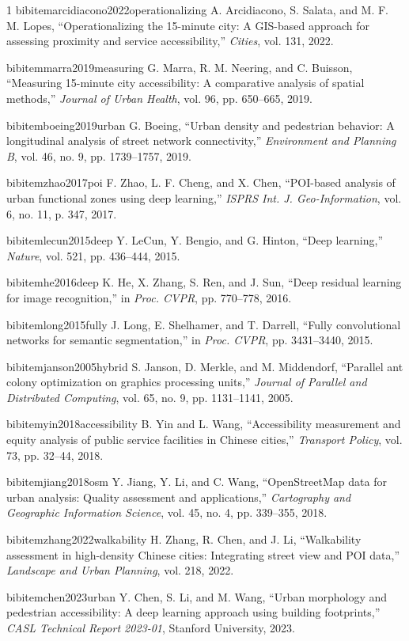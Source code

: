 \documentclass[journal]{IEEEtran}
\begin{document}
\begin{thebibliography}{1}
bibitem{arcidiacono2022operationalizing} A. Arcidiacono, S. Salata, and M. F. M. Lopes, ``Operationalizing the 15-minute city: A GIS-based approach for assessing proximity and service accessibility,'' \emph{Cities}, vol. 131, 2022.

bibitem{marra2019measuring} G. Marra, R. M. Neering, and C. Buisson, ``Measuring 15-minute city accessibility: A comparative analysis of spatial methods,'' \emph{Journal of Urban Health}, vol. 96, pp. 650--665, 2019.

bibitem{boeing2019urban} G. Boeing, ``Urban density and pedestrian behavior: A longitudinal analysis of street network connectivity,'' \emph{Environment and Planning B}, vol. 46, no. 9, pp. 1739--1757, 2019.

bibitem{zhao2017poi} F. Zhao, L. F. Cheng, and X. Chen, ``POI-based analysis of urban functional zones using deep learning,'' \emph{ISPRS Int. J. Geo-Information}, vol. 6, no. 11, p. 347, 2017.

bibitem{lecun2015deep} Y. LeCun, Y. Bengio, and G. Hinton, ``Deep learning,'' \emph{Nature}, vol. 521, pp. 436--444, 2015.

bibitem{he2016deep} K. He, X. Zhang, S. Ren, and J. Sun, ``Deep residual learning for image recognition,'' in \emph{Proc. CVPR}, pp. 770--778, 2016.

bibitem{long2015fully} J. Long, E. Shelhamer, and T. Darrell, ``Fully convolutional networks for semantic segmentation,'' in \emph{Proc. CVPR}, pp. 3431--3440, 2015.

bibitem{janson2005hybrid} S. Janson, D. Merkle, and M. Middendorf, ``Parallel ant colony optimization on graphics processing units,'' \emph{Journal of Parallel and Distributed Computing}, vol. 65, no. 9, pp. 1131--1141, 2005.

bibitem{yin2018accessibility} B. Yin and L. Wang, ``Accessibility measurement and equity analysis of public service facilities in Chinese cities,'' \emph{Transport Policy}, vol. 73, pp. 32--44, 2018.

bibitem{jiang2018osm} Y. Jiang, Y. Li, and C. Wang, ``OpenStreetMap data for urban analysis: Quality assessment and applications,'' \emph{Cartography and Geographic Information Science}, vol. 45, no. 4, pp. 339--355, 2018.

bibitem{zhang2022walkability} H. Zhang, R. Chen, and J. Li, ``Walkability assessment in high-density Chinese cities: Integrating street view and POI data,'' \emph{Landscape and Urban Planning}, vol. 218, 2022.

bibitem{chen2023urban} Y. Chen, S. Li, and M. Wang, ``Urban morphology and pedestrian accessibility: A deep learning approach using building footprints,'' \emph{CASL Technical Report 2023-01}, Stanford University, 2023.


\end{thebibliography}
\end{document}
